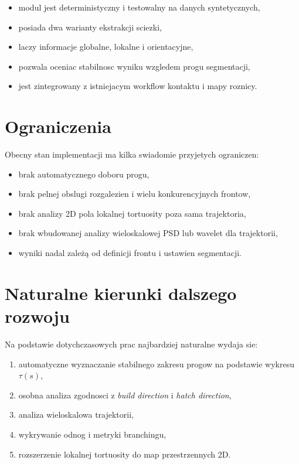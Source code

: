 \documentclass[11pt,a4paper]{article}
\begin{document}
\begin{itemize}[leftmargin=1.5em]
    \item modul jest deterministyczny i testowalny na danych syntetycznych,
    \item posiada dwa warianty ekstrakcji sciezki,
    \item laczy informacje globalne, lokalne i orientacyjne,
    \item pozwala oceniac stabilnosc wyniku wzgledem progu segmentacji,
    \item jest zintegrowany z istniejacym workflow kontaktu i mapy roznicy.
\end{itemize}

\section{Ograniczenia}

Obecny stan implementacji ma kilka swiadomie przyjetych ograniczen:

\begin{itemize}[leftmargin=1.5em]
    \item brak automatycznego doboru progu,
    \item brak pelnej obslugi rozgalezien i wielu konkurencyjnych frontow,
    \item brak analizy 2D pola lokalnej tortuosity poza sama trajektoria,
    \item brak wbudowanej analizy wieloskalowej PSD lub wavelet dla trajektorii,
    \item wyniki nadal zależą od definicji frontu i ustawien segmentacji.
\end{itemize}

\section{Naturalne kierunki dalszego rozwoju}

Na podstawie dotychczasowych prac najbardziej naturalne wydaja sie:

\begin{enumerate}[leftmargin=1.5em]
    \item automatyczne wyznaczanie stabilnego zakresu progow na podstawie
    wykresu \(\tau(s)\),
    \item osobna analiza zgodnosci z \emph{build direction} i
    \emph{hatch direction},
    \item analiza wieloskalowa trajektorii,
    \item wykrywanie odnog i metryki branchingu,
    \item rozszerzenie lokalnej tortuosity do map przestrzennych 2D.
\end{enumerate}
\end{document}
